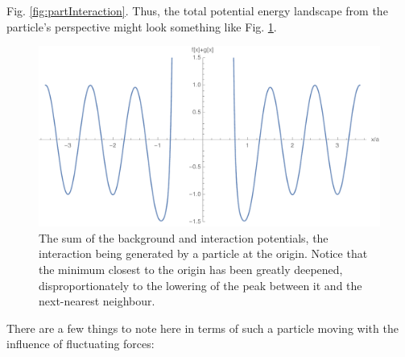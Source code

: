 Fig. \ref{fig:partInteraction}. Thus, the 
total potential energy landscape from the particle's perspective might look something like 
Fig. \ref{fig:fullPot}.
\begin{figure} \caption[The sum of the background and interaction potentials.]{The sum of the background
and interaction potentials, the interaction being generated by a particle at the origin. Notice that
the minimum closest to the origin has been greatly deepened, disproportionately to the lowering
of the peak between it and the next-nearest neighbour.} 
\label{fig:fullPot}
\begin{center}
\includegraphics[width=1.0\textwidth]{intro/images/fgSumPlot}
\end{center}
\end{figure}
There are a few things to note here in terms of such a particle moving with
the influence of fluctuating forces:
